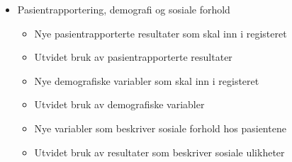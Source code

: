 \documentclass[norsk, a4paper, twocolumn]{report}
\begin{document}
\begin{itemize}
\begin{itemize}
    \end{itemize}
  \item Pasientrapportering, demografi og sosiale forhold
    \begin{itemize}
      \item Nye pasientrapporterte resultater som skal inn i registeret
      \item Utvidet bruk av pasientrapporterte resultater
      \item Nye demografiske variabler som skal inn i registeret
      \item Utvidet bruk av demografiske variabler
      \item Nye variabler som beskriver sosiale forhold hos pasientene
      \item Utvidet bruk av resultater som beskriver sosiale ulikheter
    \end{itemize}
\end{itemize}



\listoftables
\end{document}
